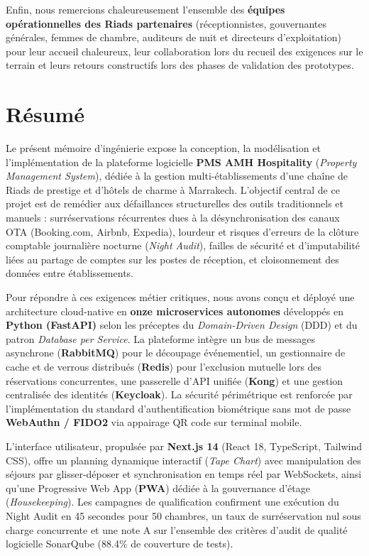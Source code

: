 \documentclass[12pt,a4paper,oneside]{report}
\begin{document}
Enfin, nous remercions chaleureusement l'ensemble des \textbf{équipes opérationnelles des Riads partenaires} (réceptionnistes, gouvernantes générales, femmes de chambre, auditeurs de nuit et directeurs d'exploitation) pour leur accueil chaleureux, leur collaboration lors du recueil des exigences sur le terrain et leurs retours constructifs lors des phases de validation des prototypes.

\clearpage

\chapter*{Résumé}

Le présent mémoire d'ingénierie expose la conception, la modélisation et l'implémentation de la plateforme logicielle \textbf{PMS AMH Hospitality} (\textit{Property Management System}), dédiée à la gestion multi-établissements d'une chaîne de Riads de prestige et d'hôtels de charme à Marrakech. L'objectif central de ce projet est de remédier aux défaillances structurelles des outils traditionnels et manuels : surréservations récurrentes dues à la désynchronisation des canaux OTA (Booking.com, Airbnb, Expedia), lourdeur et risques d'erreurs de la clôture comptable journalière nocturne (\textit{Night Audit}), failles de sécurité et d'imputabilité liées au partage de comptes sur les postes de réception, et cloisonnement des données entre établissements.

Pour répondre à ces exigences métier critiques, nous avons conçu et déployé une architecture cloud-native en \textbf{onze microservices autonomes} développés en \textbf{Python (FastAPI)} selon les préceptes du \textit{Domain-Driven Design} (DDD) et du patron \textit{Database per Service}. La plateforme intègre un bus de messages asynchrone (\textbf{RabbitMQ}) pour le découpage événementiel, un gestionnaire de cache et de verrous distribués (\textbf{Redis}) pour l'exclusion mutuelle lors des réservations concurrentes, une passerelle d'API unifiée (\textbf{Kong}) et une gestion centralisée des identités (\textbf{Keycloak}). La sécurité périmétrique est renforcée par l'implémentation du standard d'authentification biométrique sans mot de passe \textbf{WebAuthn / FIDO2} via appairage QR code sur terminal mobile.

L'interface utilisateur, propulsée par \textbf{Next.js 14} (React 18, TypeScript, Tailwind CSS), offre un planning dynamique interactif (\textit{Tape Chart}) avec manipulation des séjours par glisser-déposer et synchronisation en temps réel par WebSockets, ainsi qu'une Progressive Web App (\textbf{PWA}) dédiée à la gouvernance d'étage (\textit{Housekeeping}). Les campagnes de qualification confirment une exécution du Night Audit en 45 secondes pour 50 chambres, un taux de surréservation nul sous charge concurrente et une note A sur l'ensemble des critères d'audit de qualité logicielle SonarQube (88.4\% de couverture de tests).
\end{document}
